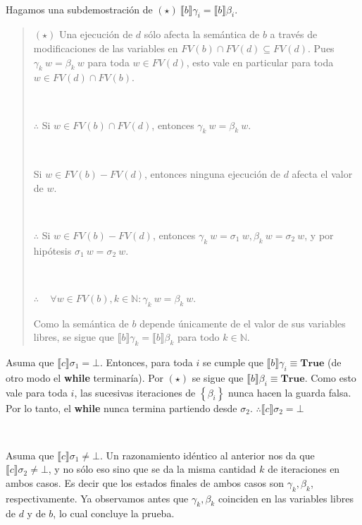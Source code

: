 \documentclass[article, 12pt]{article}
\begin{document}
~

Hagamos una subdemostración de $(\star) ~  \llbracket b \rrbracket\gamma_i = \llbracket b
\rrbracket\beta_i$. 


\small
\begin{quote}

$(\star)$ Una ejecución de $d$ sólo afecta la semántica de $b$ a través de modificaciones
de las variables en $FV(b) \cap FV(d) \subseteq FV(d)$. Pues $\gamma_k ~ w =
\beta_k ~ w$ para toda $w \in FV(d)$, esto vale en particular para toda $w \in
FV(d) \cap FV(b)$.

~

$\therefore $ Si $w \in FV(b) \cap FV(d)$, entonces $\gamma_k ~ w = \beta_k ~
w$.

~

Si $w \in FV(b) - FV(d)$, entonces ninguna ejecución de $d$ afecta el valor de
$w$.

~ 

$\therefore $  Si $w \in FV(b) - FV(d)$, entonces $\gamma_k ~ w = \sigma_1 ~ w,
\beta_k ~ w = \sigma_2 ~ w$, y por hipótesis $\sigma_1 ~ w = \sigma_2 ~ w$.

~

$\therefore $ ~ $\forall w \in FV(b), k \in \mathbb{N} : \gamma_k ~ w = \beta_k
~ w$.

Como la semántica de $b$ depende únicamente de el valor de sus variables libres,
se sigue que $\llbracket b \rrbracket\gamma_k = \llbracket b \rrbracket\beta_k$
para todo $k \in \mathbb{N}$.

\end{quote}
\normalsize


Asuma que $\llbracket c \rrbracket\sigma_1 =\bot $. Entonces, para toda $i$ se
cumple que $\llbracket b \rrbracket\gamma_i \equiv \textbf{True}$ (de otro modo
el \textbf{while} terminaría). Por $(\star)$ se sigue que $\llbracket b
\rrbracket\beta_i \equiv \textbf{True}$. Como esto vale para toda $i$, las
sucesivas iteraciones de $\left\{ \beta_i \right\} $ nunca hacen la guarda
falsa. Por lo tanto, el \textbf{while} nunca termina partiendo desde $\sigma_2$.
$\therefore \llbracket c \rrbracket\sigma_2 = \bot $

~ 

Asuma que $\llbracket c \rrbracket\sigma_1 \neq \bot$. Un razonamiento idéntico
al anterior nos da que $\llbracket c \rrbracket\sigma_2 \neq \bot $, y no sólo
eso sino que se da la misma cantidad $k$ de iteraciones en ambos casos. Es decir
que los estados finales de ambos casos son $\gamma_k, \beta_k$, respectivamente.
Ya observamos antes que $\gamma_k, \beta_k$ coinciden en las variables libres de
$d$ y de $b$, lo cual concluye la prueba.
\end{document}
